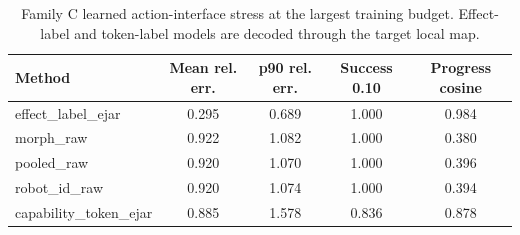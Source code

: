 \begin{table}[t]
\centering
\small
\caption{Family C learned action-interface stress at the largest training budget. Effect-label and token-label models are decoded through the target local map.}
\label{tab:learning}
\begin{tabular}{lcccc}
\toprule
Method & Mean rel. err. & p90 rel. err. & Success 0.10 & Progress cosine \\
\midrule
effect\_label\_ejar & 0.295 & 0.689 & 1.000 & 0.984 \\
morph\_raw & 0.922 & 1.082 & 1.000 & 0.380 \\
pooled\_raw & 0.920 & 1.070 & 1.000 & 0.396 \\
robot\_id\_raw & 0.920 & 1.074 & 1.000 & 0.394 \\
capability\_token\_ejar & 0.885 & 1.578 & 0.836 & 0.878 \\
\bottomrule
\end{tabular}
\end{table}
